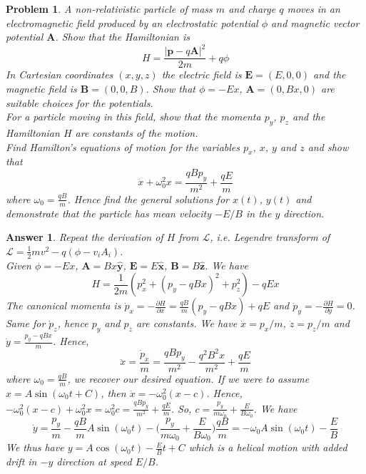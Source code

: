 \documentclass[a4paper]{article}
\newtheorem{ans}{Answer}[subsection]
\theoremstyle{new}
\newtheorem{qns}{Problem}[section]
\begin{document}
\begin{qns}
A non-relativistic particle of mass $m$ and charge $q$ moves in an electromagnetic field produced by an electrostatic potential $\phi$ and magnetic vector potential $\mathbf{A}$. Show that the Hamiltonian is 
$$H=\frac{|\mathbf{p}-q\mathbf{A}|^2}{2m}+q\phi$$
In Cartesian coordinates $(x,y,z)$ the electric field is $\mathbf{E}=(E,0,0)$ and the magnetic field is $\mathbf{B}=(0,0,B)$. Show that $\phi=-Ex$, $\mathbf{A}=(0,Bx,0)$ are suitable choices for the potentials.\\[5pt]
For a particle moving in this field, show that the momenta $p_y$, $p_z$ and the Hamiltonian $H$ are constants of the motion.\\[5pt]
Find Hamilton’s equations of motion for the variables $p_x$, $x$, $y$ and $z$ and show that
$$\ddot{x}+\omega_0^2x=\frac{qBp_y}{m^2}+\frac{qE}{m}$$
where $\omega_0=\frac{qB}{m}$. Hence find the general solutions for $x(t)$, $y(t)$ and demonstrate that the particle has mean velocity $-E/B$ in the $y$ direction.
\end{qns}
\begin{ans}
Repeat the derivation of $H$ from $\mathcal{L}$, i.e. Legendre transform of $\mathcal{L}=\frac{1}{2}mv^2-q(\phi-v_iA_i)$.\\[5pt]
Given $\phi=-Ex$, $\mathbf{A}=Bx\mathbf{\hat{y}}$, $\mathbf{E}=E\mathbf{\hat{x}}$, $\mathbf{B}=B\mathbf{\hat{z}}$. We have
$$H=\frac{1}{2m}(p_x^2+(p_y-qBx)^2+p_z^2)-qEx$$
The canonical momenta is $\dot{p}_x=-\frac{\partial H}{\partial x}=\frac{qB}{m}(p_y-qBx)+qE$ and $\dot{p}_y=-\frac{\partial H}{\partial y}=0$. Same for $\dot{p}_z$, hence $p_y$ and $p_z$ are constants. We have $\dot{x}=p_x/m$, $\dot{z}=p_z/m$ and $\dot{y}=\frac{p_y-qBx}{m}$. Hence, 
$$\ddot{x}=\frac{\dot{p}_x}{m}=\frac{qBp_y}{m^2}-\frac{q^2B^2x}{m^2}+\frac{qE}{m}$$
where $\omega_0=\frac{qB}{m}$, we recover our desired equation. If we were to assume $x=A\sin(\omega_0t+C)$, then $\ddot{x}=-\omega_0^2(x-c)$. Hence, $-\omega_0^2(x-c)+\omega_0^2x=\omega_0^2c=\frac{qBp_y}{m^2}+\frac{qE}{m}$. So, $c=\frac{p_y}{m\omega_0}+\frac{E}{B\omega_0}$. We have
$$\dot{y}=\frac{p_y}{m}-\frac{qB}{m}A\sin(\omega_0t)-\bigg(\frac{p_y}{m\omega_0}+\frac{E}{B\omega_0}\bigg)\frac{qB}{m}=-\omega_0A\sin(\omega_0t)-\frac{E}{B}$$
We thus have $y=A\cos(\omega_0t)-\frac{E}{B}t+C$ which is a helical motion with added drift in $-y$ direction at speed $E/B$.
\end{ans}
\end{document}

